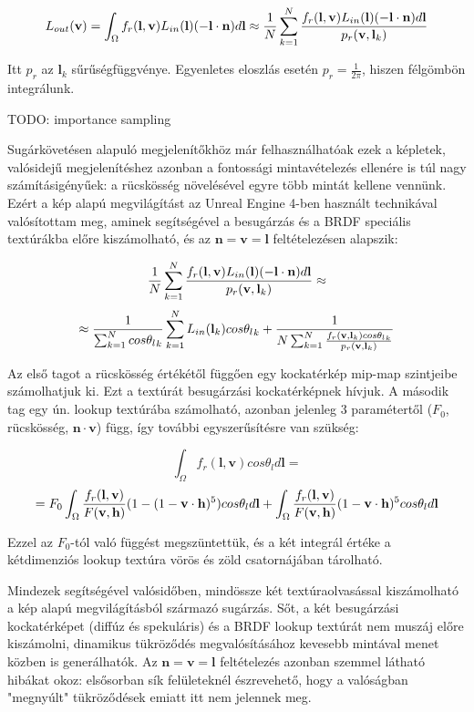 \[
L_{out}(\mathbf{v}) = \int_{\Omega} { f_r(\mathbf{l}, \mathbf{v}) L_{in}(\mathbf{l})(-\mathbf{l} \cdot \mathbf{n}) d\mathbf{l} } \approx { 1 \over N } \sum_{k=1}^{N} { { f_r(\mathbf{l}, \mathbf{v}) L_{in}(\mathbf{l})(-\mathbf{l} \cdot \mathbf{n}) d\mathbf{l} } \over { p_r(\mathbf{v}, \mathbf{l}_k) } }
\]

Itt \(p_r\) az \(\mathbf{l}_k\) sűrűségfüggvénye. Egyenletes eloszlás esetén \(p_r = \frac{1}{2\pi}\), hiszen félgömbön integrálunk.

TODO: importance sampling

Sugárkövetésen alapuló megjelenítőkhöz már felhasználhatóak ezek a képletek, valósidejű megjelenítéshez azonban a fontossági mintavételezés ellenére is túl nagy számításigényűek: a rücskösség növelésével egyre több mintát kellene vennünk. Ezért a kép alapú megvilágítást az Unreal Engine 4-ben használt technikával~\cite{karis2013real} valósítottam meg, aminek segítségével a besugárzás és a BRDF speciális textúrákba előre kiszámolható, és az \(\mathbf{n} = \mathbf{v} = \mathbf{l}\) feltételezésen alapszik:

\[
{ 1 \over N } \sum_{k=1}^{N} { { f_r(\mathbf{l}, \mathbf{v}) L_{in}(\mathbf{l})(-\mathbf{l} \cdot \mathbf{n}) d\mathbf{l} } \over { p_r(\mathbf{v}, \mathbf{l}_k) } } \approx
\]
\[
\approx { { 1 \over \sum_{k=1}^{N} cos{\theta_l}_k } \sum_{k=1}^{N} L_{in}(\mathbf{l}_k)cos{\theta_l}_k } + { 1 \over N \sum_{k=1}^{N} { { f_r(\mathbf{v}, \mathbf{l}_k) cos{\theta_l}_k} \over { p_r(\mathbf{v}, \mathbf{l}_k) } } }
\]

Az első tagot a rücskösség értékétől függően egy kockatérkép mip-map szintjeibe számolhatjuk ki. Ezt a textúrát besugárzási kockatérképnek hívjuk. A második tag egy ún. lookup textúrába számolható, azonban jelenleg 3 paramétertől (\(F_0\), rücskösség, \(\mathbf{n} \cdot \mathbf{v}\)) függ, így további egyszerűsítésre van szükség:

\[
\int_{\Omega} { f_r(\mathbf{l}, \mathbf{v}) cos\theta_l d\mathbf{l} } =
\]
\[= F_0 \int_{\Omega} { { f_r(\mathbf{l}, \mathbf{v}) \over F(\mathbf{v}, \mathbf{h}) } (1 - (1 - \mathbf{v} \cdot \mathbf{h})^5) cos\theta_l d\mathbf{l} } + \int_{\Omega} { { f_r(\mathbf{l}, \mathbf{v}) \over F(\mathbf{v}, \mathbf{h}) } (1 - \mathbf{v} \cdot \mathbf{h})^5 cos\theta_l d\mathbf{l} }
\]

Ezzel az \(F_0\)-tól való függést megszüntettük, és a két integrál értéke a kétdimenziós lookup textúra vörös és zöld csatornájában tárolható.

Mindezek segítségével valósidőben, mindössze két textúraolvasással kiszámolható a kép alapú megvilágításból származó sugárzás. Sőt, a két besugárzási kockatérképet (diffúz és spekuláris) és a BRDF lookup textúrát nem muszáj előre kiszámolni, dinamikus tükröződés megvalósításához kevesebb mintával menet közben is generálhatók. Az \(\mathbf{n} = \mathbf{v} = \mathbf{l}\) feltételezés azonban szemmel látható hibákat okoz: elsősorban sík felületeknél észrevehető, hogy a valóságban "megnyúlt" tükröződések emiatt itt nem jelennek meg.

